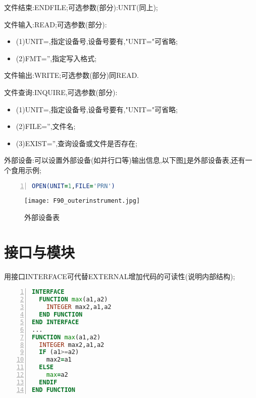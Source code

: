 文件结束:ENDFILE;可选参数(部分):UNIT(同上);\par

文件输入:READ;可选参数(部分):
\begin{itemize}
	\item{(1)UNIT=,指定设备号,设备号要有,"UNIT="可省略;}
	\item{(2)FMT='',指定写入格式;}
\end{itemize}
\par

文件输出:WRITE;可选参数(部分)同READ.\par

文件查询:INQUIRE,可选参数(部分):
\begin{itemize}
	\item{(1)UNIT=,指定设备号,设备号要有,"UNIT="可省略;}
	\item{(2)FILE='',文件名;}
	\item{(3)EXIST='',查询设备或文件是否存在;}	
\end{itemize}
\par

外部设备:可以设置外部设备(如并行口等)输出信息,以下图\ref{F90-outerinstrument}是外部设备表,还有一个食用示例;
\begin{lstlisting}[numbers=left,frame=single,language=Fortran]
OPEN(UNIT=1,FILE='PRN')
\end{lstlisting}
\par

\begin{figure}[h]
	\noindent
	\centering
	\texttt{[image: F90\_outerinstrument.jpg]}
	\caption{外部设备表}
	\label{F90-outerinstrument}
\end{figure}


\section{接口与模块}

用接口INTERFACE可代替EXTERNAL增加代码的可读性(说明内部结构);

\begin{lstlisting}[numbers=left,frame=single,language=Fortran]
INTERFACE 
  FUNCTION max(a1,a2)
    INTEGER max2,a1,a2
  END FUNCTION
END INTERFACE
...
FUNCTION max(a1,a2)
  INTEGER max2,a1,a2
  IF (a1>=a2)
    max2=a1
  ELSE
    max=a2
  ENDIF
END FUNCTION
\end{lstlisting}
\par

